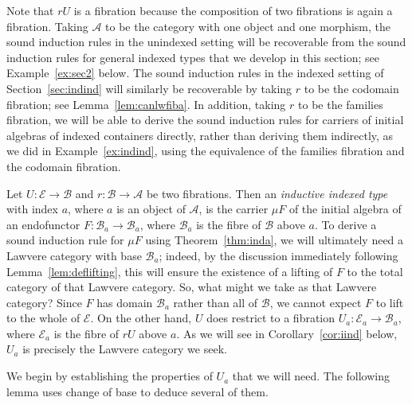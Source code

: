\documentclass{LMCS}
\newcommand{\ra}{\rightarrow}
\newcommand\E{{\mathcal E}}
\newcommand\B{{\mathcal B}}
\newcommand\A{{\mathcal A}}
\theoremstyle{plain}
\theoremstyle{remark}
\theoremstyle{definition}
\begin{document}
\noindent
Note that $rU$ is a fibration because the composition of two
fibrations is again a fibration. Taking $\mathcal{A}$ to be the
category with one object and one morphism, the sound induction rules
in the unindexed setting will be recoverable from the sound induction
rules for general indexed types that we develop in this section; see
Example~\ref{ex:sec2} below. The sound induction rules in the indexed
setting of Section~\ref{sec:indind} will similarly be recoverable by
taking $r$ to be the codomain fibration; see
Lemma~\ref{lem:canlwfiba}.  In addition, taking $r$ to be the families
fibration, we will be able to derive the sound induction rules for
carriers of initial algebras of indexed containers directly, rather
than deriving them indirectly, as we did in Example~\ref{ex:indind},
using the equivalence of the families fibration and the codomain
fibration.

Let $U : \E \ra \B$ and $r : \B \ra \A$ be two fibrations. Then an
{\em inductive indexed type} with index $a$, where $a$ is an object of
$\A$, is the carrier $\mu F$ of the initial algebra of an endofunctor
$F:\B_a \ra \B_a$, where $\B_a$ is the fibre of $\B$ above $a$. To
derive a sound induction rule for $\mu F$ using
Theorem~\ref{thm:inda}, we will ultimately need a Lawvere category
with base $\B_a$; indeed, by the discussion immediately following
Lemma~\ref{lem:deflifting}, this will ensure the existence of a
lifting of $F$ to the total category of that Lawvere category. So,
what might we take as that Lawvere category? Since $F$ has domain
$\B_a$ rather than all of $\B$, we cannot expect $F$ to lift to the
whole of $\E$. On the other hand, $U$ does restrict to a fibration
$U_a:\E_a \ra \B_a$, where $\E_a$ is the fibre of $rU$ above $a$.  As
we will see in Corollary~\ref{cor:iind} below, $U_a$ is precisely the
Lawvere category we seek.

We begin by establishing the properties of $U_a$ that we will
need. The following lemma uses change of base to deduce several of
them.
\end{document}
